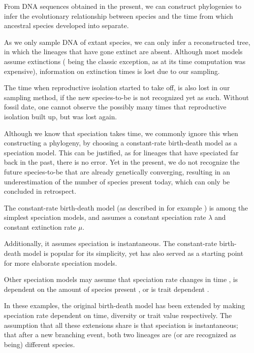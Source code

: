 \documentclass{article}
\begin{document}

From DNA sequences obtained in the present, we can construct phylogenies
to infer the evolutionary relationship between species and the time 
from which ancestral species developed into separate.
  
As we only sample DNA of extant species, 
we can only infer a reconstructed tree, in which
the lineages that have gone extinct are absent.
Although most models assume extinctions (\cite{yule1925mathematical} being the
classic exception, as at its time computation was expensive), 
information on extinction times is lost due to our sampling.


The time when reproductive isolation started to take off, is
also lost in our sampling method, if the new species-to-be is not 
recognized yet as such. Without fossil date, one cannot observe the
possibly many times that reproductive isolation built up, but was lost again.


Although we know that speciation takes time, we commonly ignore this when
constructing a phylogeny, by choosing a constant-rate birth-death model
as a speciation model. This can be justified, as for lineages 
that have speciated far back in the past, there is no error. 
Yet in the present, we do not recognize the future species-to-be
that are already genetically converging, resulting in an underestimation
of the number of species present today, which can only be 
concluded in retrospect.

The constant-rate birth-death model (as described in for example \cite{nee1994reconstructed}) 
is among the simplest speciation models, and assumes a constant speciation
 rate $\lambda$ and constant extinction rate $\mu$.

Additionally, it assumes speciation is instantaneous.
The constant-rate birth-death model is popular for its simplicity, yet
has also served as a starting point for more elaborate speciation models.


Other speciation models may assume that speciation rate changes in 
time \cite{rabosky2008explosive}, is dependent on the amount of species 
present \cite{etienne2011diversity}, or is trait 
dependent \cite{fitzjohn2009estimating}.

In these examples, the original birth-death model has been extended by making 
speciation rate dependent on time, diversity or trait value respectively.
The assumption that all these extensions share is that speciation is instantaneous;
that after a new branching event, both two lineages are (or are recognized as being) different
species.
\end{document}
